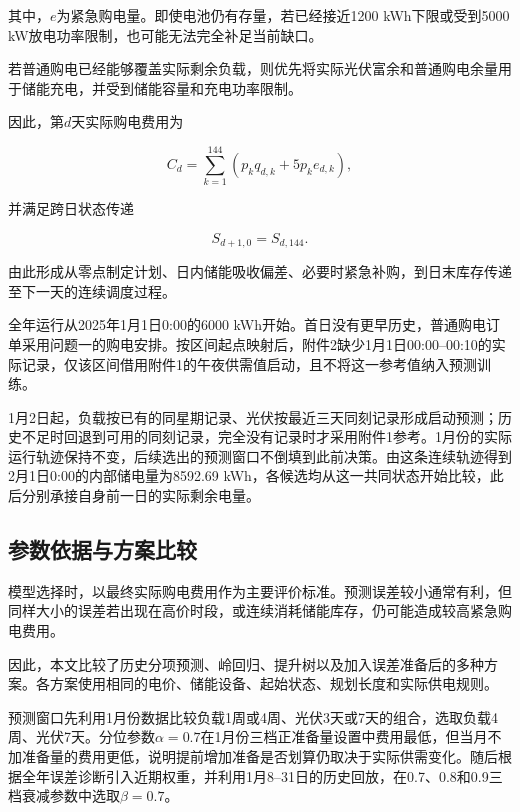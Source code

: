 其中，$e$为紧急购电量。即使电池仍有存量，若已经接近1200 kWh下限或受到5000 kW放电功率限制，也可能无法完全补足当前缺口。

若普通购电已经能够覆盖实际剩余负载，则优先将实际光伏富余和普通购电余量用于储能充电，并受到储能容量和充电功率限制。

因此，第$d$天实际购电费用为

\begin{equation}
C_d
=
\sum_{k=1}^{144}
\left(
p_kq_{d,k}
+
5p_ke_{d,k}
\right),
\label{eq:q2_daily_cost}
\end{equation}

并满足跨日状态传递

\begin{equation}
S_{d+1,0}=S_{d,144}.
\label{eq:q2_cross_day}
\end{equation}

由此形成从零点制定计划、日内储能吸收偏差、必要时紧急补购，到日末库存传递至下一天的连续调度过程。

全年运行从2025年1月1日0:00的6000 kWh开始。首日没有更早历史，普通购电订单采用问题一的购电安排。按区间起点映射后，附件2缺少1月1日00:00--00:10的实际记录，仅该区间借用附件1的午夜供需值启动，且不将这一参考值纳入预测训练。

1月2日起，负载按已有的同星期记录、光伏按最近三天同刻记录形成启动预测；历史不足时回退到可用的同刻记录，完全没有记录时才采用附件1参考。1月份的实际运行轨迹保持不变，后续选出的预测窗口不倒填到此前决策。由这条连续轨迹得到2月1日0:00的内部储电量为8592.69 kWh，各候选均从这一共同状态开始比较，此后分别承接自身前一日的实际剩余电量。


\subsection{参数依据与方案比较}

模型选择时，以最终实际购电费用作为主要评价标准。预测误差较小通常有利，但同样大小的误差若出现在高价时段，或连续消耗储能库存，仍可能造成较高紧急购电费用。

因此，本文比较了历史分项预测、岭回归、提升树以及加入误差准备后的多种方案。各方案使用相同的电价、储能设备、起始状态、规划长度和实际供电规则。

预测窗口先利用1月份数据比较负载1周或4周、光伏3天或7天的组合，选取负载4周、光伏7天。分位参数$\alpha=0.7$在1月份三档正准备量设置中费用最低，但当月不加准备量的费用更低，说明提前增加准备是否划算仍取决于实际供需变化。随后根据全年误差诊断引入近期权重，并利用1月8--31日的历史回放，在0.7、0.8和0.9三档衰减参数中选取$\beta=0.7$。

